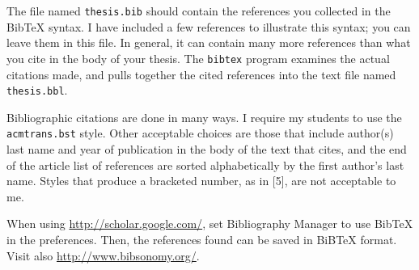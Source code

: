 The file named {\tt thesis.bib} should contain the references you collected
in the {BibTeX} syntax.  I have included a few references to
illustrate this syntax; you can leave them in this file.  In general,
it can contain many more references than what you cite in the body of
your thesis.  The {\tt bibtex} program examines the actual citations made,
and pulls together the cited references into the text file named
{\tt thesis.bbl}.


Bibliographic citations are done in many ways.  I require my students to
use the {\tt acmtrans.bst} style.  Other acceptable choices are those
that include author(s) last name and year of publication in the body
of the text that cites, and the end of the article list of references
are sorted alphabetically by the first author's last name.  Styles
that produce a bracketed number, as in [5], are not acceptable to me.

When using \url{http://scholar.google.com/}, set Bibliography Manager
to use BibTeX in the preferences.  Then, the references found
can be saved in BiBTeX{} format.  Visit also
\url{http://www.bibsonomy.org/}.

